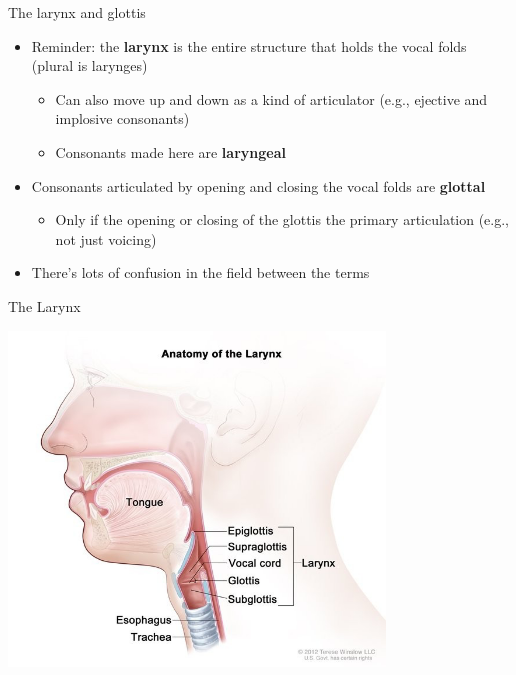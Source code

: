 \documentclass[professionalfonts]{beamer}
\begin{document}
\begin{frame}{The larynx and glottis}
    \begin{itemize}
        \item Reminder: the \textbf{larynx} is the entire structure that holds the vocal folds (plural is larynges)
        \begin{itemize}
            \item Can also move up and down as a kind of articulator (e.g., ejective and implosive consonants)
            \item Consonants made here are \textbf{laryngeal}
        \end{itemize}
        \item Consonants articulated by opening and closing the vocal folds are \textbf{glottal}
        \begin{itemize}
            \item Only if the opening or closing of the glottis the primary articulation (e.g., not just voicing)
        \end{itemize}
        \item There's lots of confusion in the field between the terms
    \end{itemize}
\end{frame}

\begin{frame}{The Larynx}
    \begin{center}
        \includegraphics[width = 0.75\textwidth]{figs/AnatamyLarynx.png}
    \end{center}
\end{frame}
\end{document}
